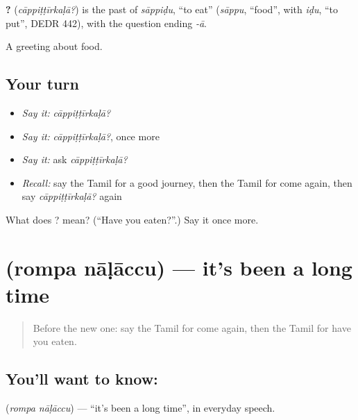 \begin{cousinweb}
\textbf{?} (\emph{cāppiṭṭīrkaḷā?}) is the past of \emph{sāppiḍu}, \textquotedblleft{}to eat\textquotedblright{} (\emph{sāppu}, \textquotedblleft{}food\textquotedblright{}, with \emph{iḍu}, \textquotedblleft{}to put\textquotedblright{}, DEDR 442), with the question ending \emph{-ā}.
\end{cousinweb}

\begin{grammarlens}[title={What you've built}]
A greeting about food.
\end{grammarlens}

\subsection*{Your turn}
\begin{itemize}
\raggedright
  \item \emph{Say it:} \emph{cāppiṭṭīrkaḷā?}
  \item \emph{Say it:} \emph{cāppiṭṭīrkaḷā?}, once more
  \item \emph{Say it:} ask \emph{cāppiṭṭīrkaḷā?}
  \item \emph{Recall:} say the Tamil for a good journey, then the Tamil for come again, then say \emph{cāppiṭṭīrkaḷā?} again
\end{itemize}

\begin{tcolorbox}[breakable,colback=teal!4,colframe=teal!35!black,title={Before you move on}]
What does ? mean? (\textquotedblleft{}Have you eaten?\textquotedblright{}.) Say it once more.
\end{tcolorbox}
\section[\texorpdfstring{\ta{ரொம்ப} \ta{நாளாச்சு} (rompa nāḷāccu)}{ரொம்ப நாளாச்சு (rompa nāḷāccu)}]{  (rompa nāḷāccu) — it's been a long time}

\label{lesson:TA-C108-longtime}



\begin{quote}
Before the new one: say the Tamil for come again, then the Tamil for have you eaten.
\end{quote}

\subsection*{You'll want to know:  }
\textbf{ } (\emph{rompa nāḷāccu}) — \textquotedblleft{}it's been a long time\textquotedblright{}, in everyday speech.


